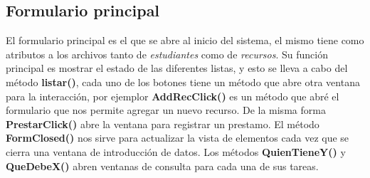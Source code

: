 \documentclass[12pt]{article}
\begin{document}
\subsection{Formulario principal}

El formulario principal es el que se abre al inicio del sistema,  el mismo tiene como atributos a los archivos tanto de \textit{estudiantes} como de \textit{recursos}.  Su función principal es mostrar el estado de las diferentes listas, y esto se lleva a cabo del método \textbf{listar()}, cada uno de los botones tiene un método que abre otra ventana para la interacción,  por ejemplor \textbf{AddRecClick()} es un método que abré el formulario que nos permite agregar un nuevo recurso.  
De la misma forma \textbf{PrestarClick()} abre la ventana para registrar un prestamo.  El método \textbf{FormClosed()} nos sirve para actualizar la vista de elementos cada vez que se cierra una ventana de introducción de datos.  
Los métodos \textbf{QuienTieneY()} y \textbf{QueDebeX()} abren ventanas de consulta para cada una de sus tareas.
\end{document}
